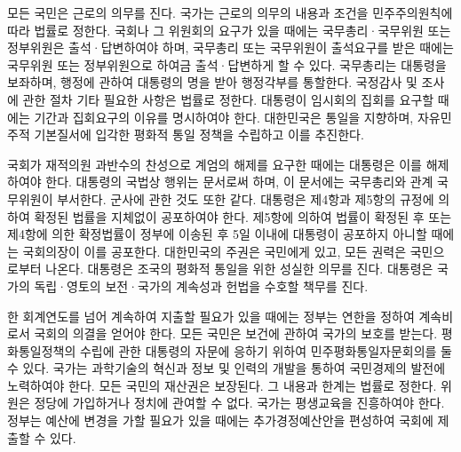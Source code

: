 \documentclass[../document.tex]{subfiles}
\begin{document}

\begin{abstractko}


모든 국민은 근로의 의무를 진다. 국가는 근로의 의무의 내용과 조건을 민주주의원칙에 따라 법률로 정한다. 국회나 그 위원회의 요구가 있을 때에는 국무총리·국무위원 또는 정부위원은 출석·답변하여야 하며, 국무총리 또는 국무위원이 출석요구를 받은 때에는 국무위원 또는 정부위원으로 하여금 출석·답변하게 할 수 있다. 국무총리는 대통령을 보좌하며, 행정에 관하여 대통령의 명을 받아 행정각부를 통할한다. 국정감사 및 조사에 관한 절차 기타 필요한 사항은 법률로 정한다. 대통령이 임시회의 집회를 요구할 때에는 기간과 집회요구의 이유를 명시하여야 한다. 대한민국은 통일을 지향하며, 자유민주적 기본질서에 입각한 평화적 통일 정책을 수립하고 이를 추진한다.

국회가 재적의원 과반수의 찬성으로 계엄의 해제를 요구한 때에는 대통령은 이를 해제하여야 한다. 대통령의 국법상 행위는 문서로써 하며, 이 문서에는 국무총리와 관계 국무위원이 부서한다. 군사에 관한 것도 또한 같다. 대통령은 제4항과 제5항의 규정에 의하여 확정된 법률을 지체없이 공포하여야 한다. 제5항에 의하여 법률이 확정된 후 또는 제4항에 의한 확정법률이 정부에 이송된 후 5일 이내에 대통령이 공포하지 아니할 때에는 국회의장이 이를 공포한다. 대한민국의 주권은 국민에게 있고, 모든 권력은 국민으로부터 나온다. 대통령은 조국의 평화적 통일을 위한 성실한 의무를 진다. 대통령은 국가의 독립·영토의 보전·국가의 계속성과 헌법을 수호할 책무를 진다.

한 회계연도를 넘어 계속하여 지출할 필요가 있을 때에는 정부는 연한을 정하여 계속비로서 국회의 의결을 얻어야 한다. 모든 국민은 보건에 관하여 국가의 보호를 받는다. 평화통일정책의 수립에 관한 대통령의 자문에 응하기 위하여 민주평화통일자문회의를 둘 수 있다. 국가는 과학기술의 혁신과 정보 및 인력의 개발을 통하여 국민경제의 발전에 노력하여야 한다. 모든 국민의 재산권은 보장된다. 그 내용과 한계는 법률로 정한다. 위원은 정당에 가입하거나 정치에 관여할 수 없다. 국가는 평생교육을 진흥하여야 한다. 정부는 예산에 변경을 가할 필요가 있을 때에는 추가경정예산안을 편성하여 국회에 제출할 수 있다.

\end{abstractko}
\end{document}
